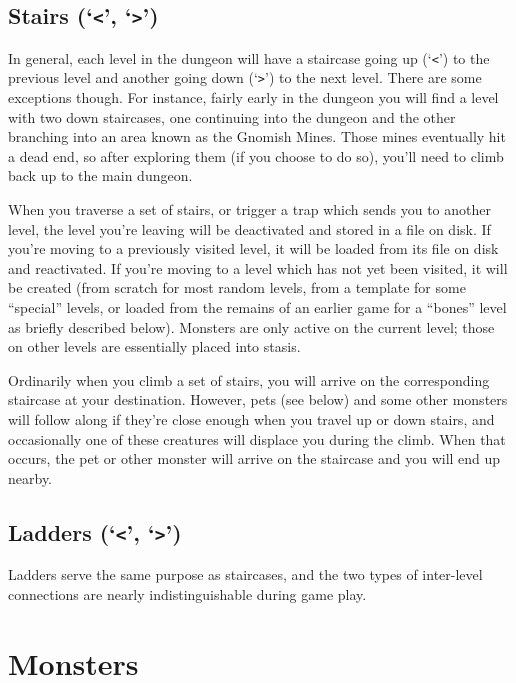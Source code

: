 \subsection*{Stairs (`{\tt <}', `{\tt >}')}

In general, each level in the dungeon will have a staircase going up
(`{\tt <}') to the previous level and another going down (`{\tt >}')
to the next
level.  There are some exceptions though.  For instance, fairly early
in the dungeon you will find a level with two down staircases, one
continuing into the dungeon and the other branching into an area
known as the Gnomish Mines.  Those mines eventually hit a dead end,
so after exploring them (if you choose to do so), you'll need to
climb back up to the main dungeon.

When you traverse a set of stairs, or trigger a trap which sends you
to another level, the level you're leaving will be deactivated and
stored in a file on disk.  If you're moving to a previously visited
level, it will be loaded from its file on disk and reactivated.  If
you're moving to a level which has not yet been visited, it will be
created (from scratch for most random levels, from a template for
some ``special'' levels, or loaded from the remains of an earlier game
for a ``bones'' level as briefly described below).  Monsters are only
active on the current level; those on other levels are essentially
placed into stasis.
 
Ordinarily when you climb a set of stairs, you will arrive on the
corresponding staircase at your destination.  However, pets (see below)
and some other monsters will follow along if they're close enough when
you travel up or down stairs, and occasionally one of these creatures
will displace you during the climb.  When that occurs, the pet or other
monster will arrive on the staircase and you will end up nearby.

\subsection*{Ladders (`{\tt <}', `{\tt >}')}

Ladders serve the same purpose as staircases, and the two types of
inter-level connections are nearly indistinguishable during game play.

\section{Monsters}

